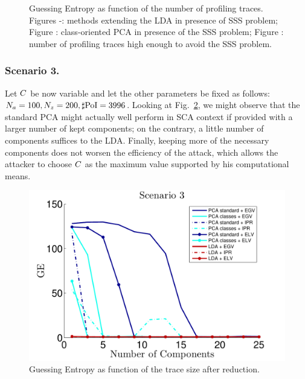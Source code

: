 \begin{figure}
\caption[Guessing Entropy as function of the number of profiling traces.]{Guessing Entropy as function of the number of profiling traces. Figures -: methods extending the LDA in presence of SSS problem; Figure : class-oriented PCA in presence of the SSS problem; Figure : number of profiling traces high enough to avoid the SSS problem.}\label{fig:scenario2}
\end{figure}


\subsubsection{Scenario 3.}
Let  $C$ be now variable and let the other parameters be fixed as follows: $N_a = 100, N_z=200, \sharp\mathrm{PoI} = 3996$. Looking at Fig.~\ref{fig:3}, we might observe that the standard PCA might actually well perform in SCA context if provided with a larger number of kept components; on the contrary, a little number of components suffices to the LDA. Finally, keeping more of the necessary components does not worsen the efficiency of the attack, which allows the attacker to choose $C$ as the maximum value supported by his computational means.

\begin{figure}
\centering
\includegraphics[width=.5\textwidth]{../Figures/CARDIS2015/Criterion3.pdf}
\caption{Guessing Entropy as function of the trace size after reduction.}\label{fig:3}
\end{figure}

